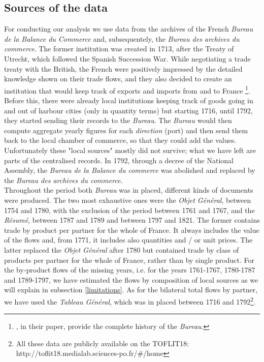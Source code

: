 \documentclass[12pt,a4paper,notitlepage,english]{article}
\begin{document}
\subsection{Sources of the data} \label{sources_of_data}
For conducting our analysis we use data from the archives of the French \textit{Bureau de la Balance du Commerce} and, subsequentely, the \textit{Bureau des archives du commerce}. The former institution was created in 1713, after the Treaty of Utrecht, which followed the Spanish Succession War. While negotiating a trade treaty with the British, the French were positively impressed by the detailed knowledge shown on their trade flows, and they also decided to create an institution that would keep track of exports and imports from and to France \citep{charles2011collecte}\footnote{\cite{charles2011collecte}, in their paper, provide the complete history of the \textit{Bureau}.}. Before this, there were already local institutions keeping track of goods going in and out of harbour cities (only in quantity terms) but starting 1716, until 1792, they started sending their records to the \textit{Bureau}. The \textit{Bureau} would then compute aggregate yearly figures for each \textit{direction} (port) and then send them back to the local chamber of commerce, so that they could add the values. Unfortunately these "local sources" mostly did not survive; what we have left are parts of the centralised records. In 1792, through a decree of the National Assembly, the \textit{Bureau de la Balance du commerce} was abolished and replaced by the \textit{Bureau des archives du commerce}.  \\
Throughout the period both \textit{Bureau} was in placed, different kinds of documents were produced. The two most exhaustive ones were the \textit{Objet Général}, between 1754 and 1780, with the exclusion of the period between 1761 and 1767, and the \textit{Résumé}, between 1787 and 1789 and between 1797 and 1821. The former contains trade by product per partner for the whole of France. It always includes the value of the flows and, from 1771, it includes also quantities and / or unit prices. The latter replaced the \textit{Objet Général} after 1780 but contained trade by class of products per partner for the whole of France, rather than by single product. For the by-product flows of the missing years, i.e. for the years 1761-1767, 1780-1787 and 1789-1797, we have estimated the flows by composition of local sources as we will explain in subsection \ref{limitations}. As for the bilateral total flows by partner, we have used the \textit{Tableau Général}, which was in placed between 1716 and 1792\footnote{All these data are publicly available on the TOFLIT18: http://toflit18.medialab.sciences-po.fr/\#/home }.
\end{document}
